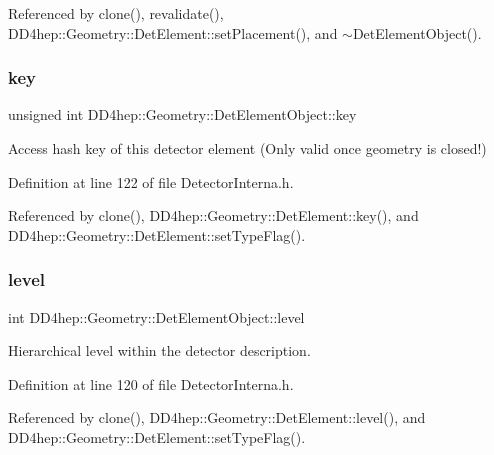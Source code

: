 Referenced by clone(), revalidate(), D\+D4hep\+::\+Geometry\+::\+Det\+Element\+::set\+Placement(), and $\sim$\+Det\+Element\+Object().

\hypertarget{class_d_d4hep_1_1_geometry_1_1_det_element_object_a77994e3dcc6416eadd3be577c46a8e29}{}\label{class_d_d4hep_1_1_geometry_1_1_det_element_object_a77994e3dcc6416eadd3be577c46a8e29} 
\subsubsection{\texorpdfstring{key}{key}}
{\footnotesize\ttfamily unsigned int D\+D4hep\+::\+Geometry\+::\+Det\+Element\+Object\+::key}



Access hash key of this detector element (Only valid once geometry is closed!) 



Definition at line 122 of file Detector\+Interna.\+h.



Referenced by clone(), D\+D4hep\+::\+Geometry\+::\+Det\+Element\+::key(), and D\+D4hep\+::\+Geometry\+::\+Det\+Element\+::set\+Type\+Flag().

\hypertarget{class_d_d4hep_1_1_geometry_1_1_det_element_object_a734b4a41fa1d35d9a02b3b15d2739537}{}\label{class_d_d4hep_1_1_geometry_1_1_det_element_object_a734b4a41fa1d35d9a02b3b15d2739537} 
\subsubsection{\texorpdfstring{level}{level}}
{\footnotesize\ttfamily int D\+D4hep\+::\+Geometry\+::\+Det\+Element\+Object\+::level}



Hierarchical level within the detector description. 



Definition at line 120 of file Detector\+Interna.\+h.



Referenced by clone(), D\+D4hep\+::\+Geometry\+::\+Det\+Element\+::level(), and D\+D4hep\+::\+Geometry\+::\+Det\+Element\+::set\+Type\+Flag().

